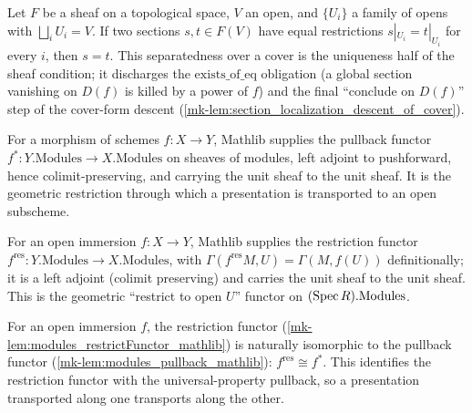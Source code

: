 \begin{lemma}
  \label{mk-lem:eq_of_locally_eq_mathlib}
  \mathlibok

  Let \(F\) be a sheaf on a topological space, \(V\) an open, and \(\{U_i\}\) a family of opens with
  \(\bigsqcup_i U_i = V\). If two sections \(s, t \in F(V)\) have equal restrictions
  \(s|_{U_i} = t|_{U_i}\) for every \(i\), then \(s = t\). This separatedness over a cover is the
  uniqueness half of the sheaf condition; it discharges the \(\mathrm{exists\_of\_eq}\) obligation
  (a global section vanishing on \(D(f)\) is killed by a power of \(f\)) and the final
  ``conclude on \(D(f)\)'' step of the cover-form descent
  (\ref{mk-lem:section_localization_descent_of_cover}).
\end{lemma}

\begin{lemma}
  \label{mk-lem:modules_pullback_mathlib}
  \mathlibok

  For a morphism of schemes \(f : X \to Y\), Mathlib supplies the pullback functor
  \(f^{*} : Y.\mathrm{Modules} \to X.\mathrm{Modules}\) on sheaves of modules, left adjoint to
  pushforward, hence colimit-preserving, and carrying the unit sheaf to the unit sheaf. It is the
  geometric restriction
  through which a presentation is transported to an open subscheme.
\end{lemma}

\begin{lemma}
  \label{mk-lem:modules_restrictFunctor_mathlib}
  \mathlibok

  For an open immersion \(f : X \to Y\), Mathlib supplies the restriction functor
  \(f^{\mathrm{res}} : Y.\mathrm{Modules} \to X.\mathrm{Modules}\), with
  \(\Gamma(f^{\mathrm{res}} M, U) = \Gamma(M, f(U))\) definitionally; it is a left adjoint (colimit
  preserving) and carries the unit sheaf to the unit sheaf. This is the geometric
  ``restrict to open \(U\)'' functor on \((\operatorname{Spec} R).\mathrm{Modules}\).
\end{lemma}

\begin{lemma}
  \label{mk-lem:modules_restrictFunctorIsoPullback_mathlib}
  \mathlibok

  For an open immersion \(f\), the restriction functor (\ref{mk-lem:modules_restrictFunctor_mathlib})
  is naturally isomorphic to the pullback functor (\ref{mk-lem:modules_pullback_mathlib}):
  \(f^{\mathrm{res}} \cong f^{*}\). This identifies the restriction functor with the
  universal-property pullback, so a presentation transported along one transports along the other.
\end{lemma}

